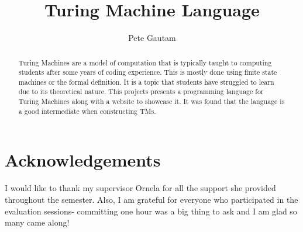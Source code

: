 \documentclass{l4proj}
\begin{document}
\title{Turing Machine Language} 
\author{Pete Gautam}

\maketitle

\begin{abstract}
Turing Machines are a model of computation that is typically taught to computing students after some years of coding experience. This is mostly done using finite state machines or the formal definition. It is a topic that students have struggled to learn due to its theoretical nature. This projects presents a programming language for Turing Machines along with a website to showcase it. It was found that the language is a good intermediate when constructing TMs.
\end{abstract}

\chapter*{Acknowledgements}

I would like to thank my supervisor Ornela for all the support she provided throughout the semester. Also, I am grateful for everyone who participated in the evaluation sessions- committing one hour was a big thing to ask and I am glad so many came along!

\def\consentname {Pete Gautam} 
\def\consentdate {20 March 2023} 
\educationalconsent

\tableofcontents







  



\renewcommand{\thechapter}{0} 


\listoffigures
\end{document}
